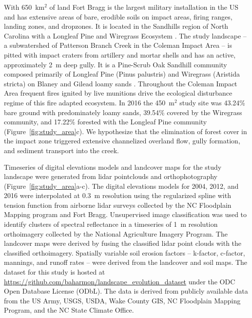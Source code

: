 \documentclass[gmd, manuscript]{copernicus}
\begin{document}
With 650~\unit{km}$^{2}$ of land
Fort Bragg is the largest military installation in the US
and has extensive areas of bare, erodible soils
on impact areas, firing ranges, landing zones, and dropzones. 
It is located in the Sandhills region of North Carolina 
with a Longleaf Pine and Wiregrass Ecosystem \citep{Sorrie2006}.
%
The study landscape
-- a subwatershed of Patterson Branch Creek 
in the Coleman Impact Area --
is pitted with impact craters from artillery and mortar shells
and has an active, approximately 2~\unit{m} deep gully. 
%
It is a Pine-Scrub Oak Sandhill community
composed primarily of Longleaf Pine (Pinus palustris)
and Wiregrass (Aristida stricta)
on Blaney and Gilead loamy sands 
\citep{Sorrie2004}. 
%
Throughout the Coleman Impact Area
frequent fires ignited by live munitions
drive the ecological disturbance regime
of this fire adapted ecosystem.
%
In 2016 the  450~\unit{m}$^{2}$ study site was
43.24\% bare ground with predominately loamy sands,
39.54\% covered by the Wiregrass community, and
17.22\% forested with the Longleaf Pine community 
(Figure~\ref{fig:study_area}c). 
%
We hypothesize that the elimination of forest cover
in the impact zone
triggered extensive channelized overland flow,
gully formation, and sediment transport into the creek. 

Timeseries of digital elevations models 
and landcover maps for the study landscape
were generated from lidar pointclouds and orthophotography
(Figure~\ref{fig:study_area}a-c). 
The digital elevations models for 2004, 2012, and 2016
were interpolated at 0.3~\unit{m} resolution
using the regularized spline with tension function \citep{Mitasova1993,Mitasova2005}
from %
airborne lidar surveys 
collected by the NC Floodplain Mapping program and Fort Bragg. 
%
Unsupervised image classification 
was used to identify clusters of spectral reflectance
in a timeseries of 1~\unit{m} resolution orthoimagery 
collected by the National Agriculture Imagery Program.
The landcover maps were derived by fusing the
classified lidar point clouds with the classified orthoimagery.
Spatially variable soil erosion factors 
-- k-factor, c-factor, mannings, and runoff rates --
were derived from the landcover and soil maps.
The dataset for this study is hosted at 
\url{https://github.com/baharmon/landscape\_evolution_dataset}
under the ODC Open Database License (ODbL).
The data is derived from publicly available data from
the US Army, USGS, USDA, Wake County GIS, NC Floodplain
Mapping Program, and the NC State Climate Office.
\end{document}
